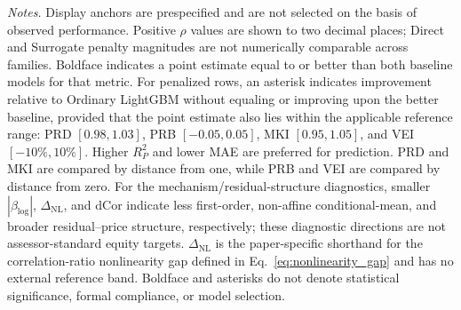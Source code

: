 \documentclass[10pt]{article}
\theoremstyle{definition}
\newcommand{\1}{\mathbf{1}}
\newcommand{\oldtext}[1]{\textcolor{blue}{\sout{#1}}}
\newenvironment{oldrevisionblock}{%
  \begingroup
  \begin{tcolorbox}[
    enhanced,breakable,
    colback=white,colframe=white,boxrule=0pt,
    left=0pt,right=0pt,top=1pt,bottom=1pt,
    coltext=blue,
    overlay unbroken={\draw[blue,line width=.45pt] (frame.south west)--(frame.north east);\draw[blue,line width=.45pt] (frame.north west)--(frame.south east);},
    overlay first={\draw[blue,line width=.45pt] (frame.south west)--(frame.north east);},
    overlay middle={\draw[blue,line width=.45pt] (frame.south west)--(frame.north east);},
    overlay last={\draw[blue,line width=.45pt] (frame.north west)--(frame.south east);}
  ]
}{\end{tcolorbox}\endgroup}
\begin{document}
\begin{oldrevisionblock}
\vspace{1mm}
\begin{minipage}{\textwidth}
\scriptsize
\emph{Notes.}
Display anchors are prespecified and are not selected on the basis of observed
performance. Positive $\rho$ values are shown to two decimal places; Direct and
Surrogate penalty magnitudes are not numerically comparable across families.
Boldface indicates a point estimate equal to or better than both baseline models
for that metric. 
For penalized rows, an asterisk indicates improvement relative to Ordinary LightGBM without equaling or improving upon the better baseline, provided that the point estimate also lies within the applicable reference range: PRD $[0.98,1.03]$, PRB $[-0.05,0.05]$, MKI $[0.95,1.05]$, and VEI $[-10\%,10\%]$. Higher $R^2_P$ and lower MAE are preferred for prediction. PRD and MKI are
compared by distance from one, while PRB and VEI are compared by distance from
zero. For the mechanism/residual-structure diagnostics, smaller
$|\beta_{\log}|$, $\Delta_{\mathrm{NL}}$, and dCor indicate less first-order,
non-affine conditional-mean, and broader residual--price structure, respectively;
these diagnostic directions are not assessor-standard equity targets.
$\Delta_{\mathrm{NL}}$ is the paper-specific shorthand for the correlation-ratio
nonlinearity gap defined in Eq.~\eqref{eq:nonlinearity_gap} and has no external
reference band. Boldface and asterisks do not denote statistical significance,
formal compliance, or model selection.
\end{minipage}
\end{oldrevisionblock}
\end{document}
